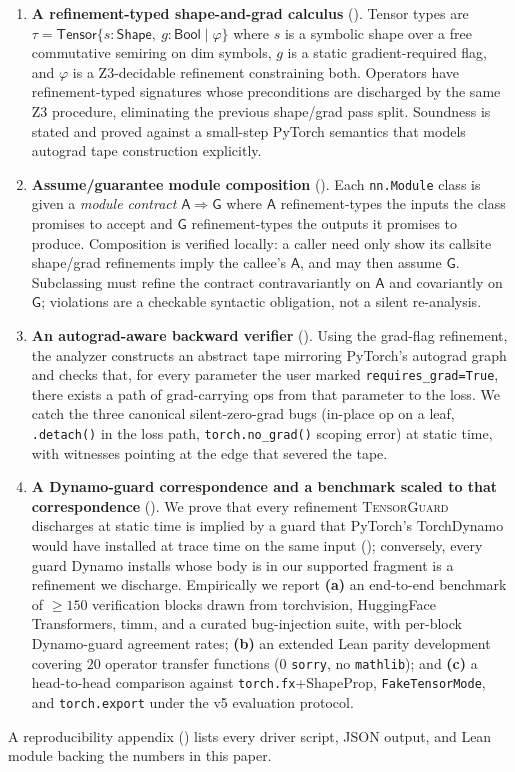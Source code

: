 \begin{enumerate}\itemsep0pt
\item \textbf{A refinement-typed shape-and-grad calculus}
  (). Tensor types are
  $\tau = \mathsf{Tensor}\{s : \mathsf{Shape},\ g :
  \mathsf{Bool}\mid \varphi\}$ where $s$ is a symbolic shape over
  a free commutative semiring on dim symbols, $g$ is a static
  gradient-required flag, and $\varphi$ is a Z3-decidable
  refinement constraining both. Operators have refinement-typed
  signatures whose preconditions are discharged by the same Z3
  procedure, eliminating the previous shape/grad pass split.
  Soundness is stated and proved against a small-step PyTorch
  semantics that models autograd tape construction explicitly.

\item \textbf{Assume/guarantee module composition}
  (). Each \verb|nn.Module| class is
  given a \emph{module contract}
  $\mathsf{A}\Rightarrow\mathsf{G}$ where $\mathsf{A}$
  refinement-types the inputs the class promises to accept and
  $\mathsf{G}$ refinement-types the outputs it promises to
  produce. Composition is verified locally: a caller need only
  show its callsite shape/grad refinements imply the callee's
  $\mathsf{A}$, and may then assume $\mathsf{G}$. Subclassing
  must refine the contract contravariantly on $\mathsf{A}$ and
  covariantly on $\mathsf{G}$; violations are a checkable
  syntactic obligation, not a silent re-analysis.

\item \textbf{An autograd-aware backward verifier}
  (). Using the grad-flag refinement, the
  analyzer constructs an abstract tape mirroring PyTorch's
  autograd graph and checks that, for every parameter the user
  marked \verb|requires_grad=True|, there exists a path of
  grad-carrying ops from that parameter to the loss. We catch the
  three canonical silent-zero-grad bugs (in-place op on a leaf,
  \verb|.detach()| in the loss path, \verb|torch.no_grad()|
  scoping error) at static time, with witnesses pointing at the
  edge that severed the tape.

\item \textbf{A Dynamo-guard correspondence and a benchmark
  scaled to that correspondence} (). We prove that
  every refinement \textsc{TensorGuard} discharges at static time
  is implied by a guard that PyTorch's TorchDynamo would have
  installed at trace time on the same input
  (); conversely, every guard Dynamo
  installs whose body is in our supported fragment is a
  refinement we discharge. Empirically we report
  \textbf{(a)} an end-to-end benchmark of $\geq 150$ verification
  blocks drawn from torchvision, HuggingFace Transformers,
  timm, and a curated bug-injection suite, with per-block
  Dynamo-guard agreement rates;
  \textbf{(b)} an extended Lean parity development covering $20$
  operator transfer functions ($0$ \verb|sorry|, no
  \verb|mathlib|); and
  \textbf{(c)} a head-to-head comparison against
  \verb|torch.fx|+ShapeProp, \verb|FakeTensorMode|, and
  \verb|torch.export| under the v5 evaluation protocol.
\end{enumerate}

A reproducibility appendix () lists every driver
script, JSON output, and Lean module backing the numbers in this
paper.
